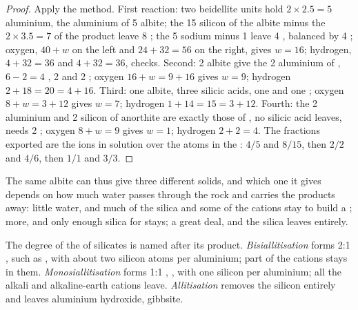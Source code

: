 \begin{proof}
Apply the method. First reaction: two beidellite units hold $2\times2.5 = 5$
aluminium, the aluminium of 5 albite; the 15 silicon of the albite minus the
$2\times3.5 = 7$ of the product leave 8 ; the 5 sodium minus 1 leave
4 , balanced by 4 ; oxygen, $40 + w$ on the left and $24 + 32 =
56$ on the right, gives $w = 16$; hydrogen, $4 + 32 = 36$ and $4 + 32 = 36$,
checks. Second: 2 albite give the 2 aluminium of , $6 - 2 = 4$
, 2  and 2 ; oxygen $16 + w = 9 + 16$ gives $w = 9$;
hydrogen $2 + 18 = 20 = 4 + 16$. Third: one albite, three silicic acids, one
 and one ; oxygen $8 + w = 3 + 12$ gives $w = 7$; hydrogen
$1 + 14 = 15 = 3 + 12$. Fourth: the 2 aluminium and 2 silicon of anorthite are
exactly those of , no silicic acid leaves,  needs 2 ;
oxygen $8 + w = 9$ gives $w = 1$; hydrogen $2 + 2 = 4$. The fractions exported
are the ions in solution over the atoms in the : $4/5$ and $8/15$, then
$2/2$ and $4/6$, then $1/1$ and $3/3$.
\end{proof}

The same albite can thus give three different solids, and which one it gives
depends on how much water passes through the rock and carries the products
away: little water, and much of the silica and some of the cations stay to
build a ; more, and only enough silica for  stays; a great
deal, and the silica leaves entirely.

\begin{definition}\label{def:b1:weathering-clays:hydrolysis-degree}
The degree of the  of silicates is named after its product.
\emph{Bisiallitisation} forms 2:1 , such as
, with about two silicon atoms per aluminium; part of the cations
stays in them. \emph{Monosiallitisation} forms 1:1
, , with one silicon per aluminium; all the alkali and
alkaline-earth cations leave. \emph{Allitisation} removes
the silicon entirely and leaves aluminium hydroxide, gibbsite.
\end{definition}

